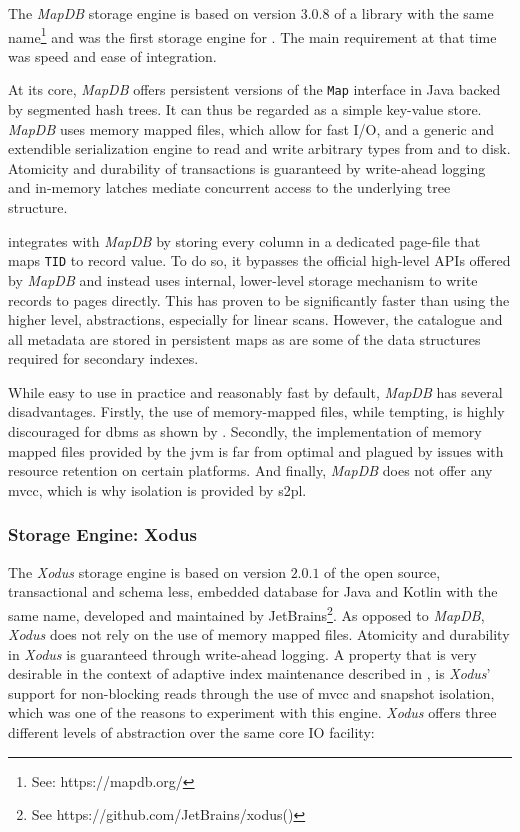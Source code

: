 The \emph{MapDB} storage engine is based on version $3.0.8$ of a library with the same name\footnote{See: https://mapdb.org/} and was the first storage engine for \cottontail{}. The main requirement at that time was speed and ease of integration.

At its core, \emph{MapDB} offers persistent versions of the \texttt{Map} interface in Java backed by segmented hash trees. It can thus be regarded as a simple key-value store. \emph{MapDB} uses memory mapped files, which allow for fast I/O, and a generic and extendible serialization engine to read and write arbitrary types from and to disk. Atomicity and durability of transactions is guaranteed by write-ahead logging and in-memory latches mediate concurrent access to the underlying tree structure.

\cottontail{} integrates with \emph{MapDB} by storing every column in a dedicated page-file that maps \texttt{TID} to record value. To do so, it bypasses the official high-level APIs offered by \emph{MapDB} and instead uses internal, lower-level storage mechanism to write records to pages directly. This has proven to be significantly faster than using the higher level, abstractions, especially for linear scans. However, the catalogue and all metadata are stored in persistent maps as are some of the data structures required for secondary indexes.

While easy to use in practice and reasonably fast by default, \emph{MapDB} has several disadvantages. Firstly, the use of memory-mapped files, while tempting, is highly discouraged for \acrshort{dbms} as shown by \cite{Crotty:2022Are}. Secondly, the implementation of memory mapped files provided by the \acrshort{jvm} is far from optimal and plagued by issues with resource retention on certain platforms. And finally, \emph{MapDB} does not offer any \acrshort{mvcc}, which is why isolation is provided by \acrshort{s2pl}.

\subsubsection{Storage Engine: Xodus}
The \emph{Xodus} storage engine is based on version $2.0.1$ of the open source, transactional and schema less, embedded database for Java and Kotlin with the same name, developed and maintained by JetBrains\footnote{See https://github.com/JetBrains/xodus()}. As opposed to \emph{MapDB}, \emph{Xodus} does not rely on the use of memory mapped files. Atomicity and durability in \emph{Xodus} is guaranteed through write-ahead logging. A property that is very desirable in the context of adaptive index maintenance described in , is \emph{Xodus}' support for non-blocking reads through the use of \acrshort{mvcc} and snapshot isolation, which was one of the reasons to experiment with this engine. \emph{Xodus} offers three different levels of abstraction over the same core IO facility:

